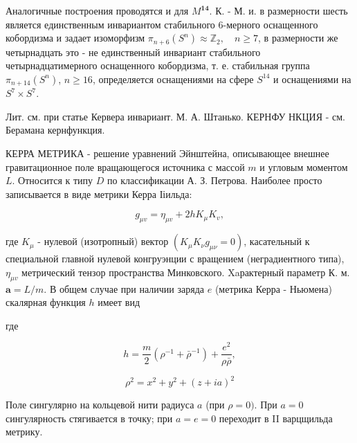 \documentclass[10pt]{article}
\begin{document}
Аналогичные построения проводятся и для $M^{\mathbf{1 4}}$. К. - М. и. в размерности шесть является единственным инвариантом стабильного 6-мерного оснащенного кобордизма и задает изоморфизм $\pi_{n+6}\left(S^{n}\right) \approx \mathbb{Z}_{2}, \quad n \geqslant 7$, в размерности же четырнадцать это - не единственный инвариант стабильного четырнадцатимерного оснащенного кобордизма, т. е. стабильная группа $\pi_{n+14}\left(S^{n}\right)$, $n \geqslant 16$, определяется оснащениями на сфере $S^{14}$ и оснащениями на $S^{7} \times S^{7}$.



Лит. см. при статье Кервера инвариант. М. А. Штанько. КЕРНФУ НКЦИЯ - см. Берамана кернфункция.



КЕРРА МЕТРИКА - решение уравнений Эйнштейна, описывающее внешнее гравитационное поле вращающегося источника с массой $m$ и угловым моментом $L$. Относится к типу $D$ по классификации А. З. Петрова. Наиболее просто записывается в виде метрики Керра Ііильда:



\[

g_{\mu v}=\eta_{\mu v}+2 h K_{\mu} K_{v},

\]



где $K_{\mu}$ - нулевой (изотропный) вектор $\left(K_{\mu} K_{\nu} g_{\mu \nu}=0\right)$, касательный $к$ специальной главной нулевой конгруэнции с вращением (неградиентного типа), $\eta_{\mu v}$ метрический тензор пространства Минковского. Xaрактерный параметр К. м. $\boldsymbol{a}=L / m$. В общем случае при наличии заряда $e$ (метрика Керра - Ньюмена) скалярная функция $h$ имеет вид



где



\[

h=\frac{m}{2}\left(\rho^{-1}+\bar{\rho}^{-1}\right)+\frac{e^{2}}{\rho \bar{\rho}},

\]



\[

\rho^{2}=x^{2}+y^{2}+(z+i a)^{2}

\]



Поле сингулярно на кольцевой нити радиуса $a$ (при $\rho=0)$. При $a=0$ сингулярность стягивается в точку; при $a=e=0$ переходит в II варцщильда метрику.
\end{document}
